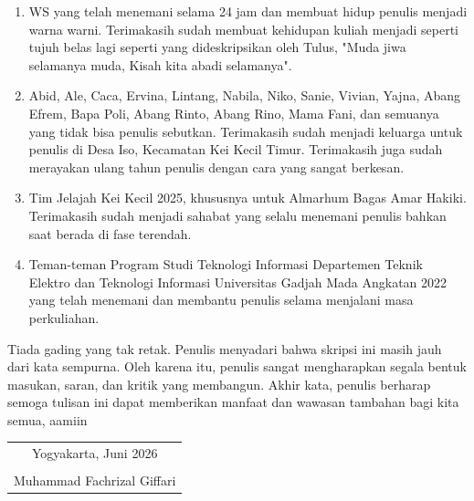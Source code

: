\begin{enumerate}
	      hingga Teknisiade, PPK Ormawa, Bengkel Inovasi, Kerja Praktik. Semoga kita
	      dapat menjadi rekan kerja lagi di kesempatan lain.
	\item WS yang telah menemani selama 24 jam dan membuat hidup penulis menjadi warna
	      warni. Terimakasih sudah membuat kehidupan kuliah menjadi seperti tujuh belas
	      lagi seperti yang dideskripsikan oleh Tulus, "Muda jiwa selamanya muda, Kisah
	      kita abadi selamanya".
	\item Abid, Ale, Caca, Ervina, Lintang, Nabila, Niko, Sanie, Vivian, Yajna, Abang
	      Efrem, Bapa Poli, Abang Rinto, Abang Rino, Mama Fani, dan semuanya yang
	      tidak bisa penulis sebutkan. Terimakasih sudah menjadi keluarga untuk penulis di
	      Desa Iso, Kecamatan Kei Kecil Timur. Terimakasih juga sudah merayakan ulang
	      tahun penulis dengan cara yang sangat berkesan.
	\item Tim Jelajah Kei Kecil 2025, khususnya untuk Almarhum Bagas Amar Hakiki.
	      Terimakasih sudah menjadi sahabat yang selalu menemani penulis bahkan saat
	      berada di fase terendah.
	\item Teman-teman Program Studi Teknologi Informasi Departemen Teknik Elektro dan
	      Teknologi Informasi Universitas Gadjah Mada Angkatan 2022 yang telah menemani
	      dan membantu penulis selama menjalani masa perkuliahan.
\end{enumerate}

Tiada gading yang tak retak. Penulis menyadari bahwa skripsi ini masih jauh dari
kata sempurna. Oleh karena itu, penulis sangat mengharapkan segala bentuk masukan,
saran, dan kritik yang membangun. Akhir kata, penulis berharap semoga tulisan ini dapat
memberikan manfaat dan wawasan tambahan bagi kita semua, aamiin

\begin{flushright}
	\begin{tabular}{c}
		Yogyakarta, Juni 2026 \\
		\vspace{1cm}          \\
		Muhammad Fachrizal Giffari
	\end{tabular}
\end{flushright}

